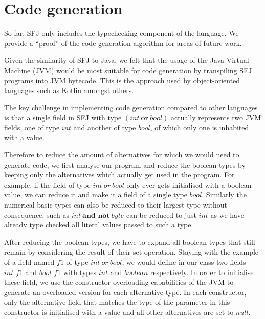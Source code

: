 \documentclass[runningheads]{llncs}
\begin{document}

\section{Code generation}

So far, SFJ only includes the typechecking component of the language. We provide a ``proof'' of the code generation algorithm for areas of future work.

Given the similarity of SFJ to Java, we felt that the usage of the Java Virtual Machine (JVM) \cite{lindholm2013} would be most suitable for code generation by transpiling SFJ programs into JVM bytecode.
This is the approach used by object-oriented languages such as Kotlin amongst others.

The key challenge in implementing code generation compared to other languages is that a single field in SFJ with type $(int\ \textbf{or}\ bool)$ actually represents two JVM fields, one of type $int$ and another of type $bool$, of which only one is inhabited with a value.

Therefore to reduce the amount of alternatives for which we would need to generate code, we first analyse our program and reduce the boolean types by keeping only the alternatives which actually get used in the program.
For example, if the field of type $int\ or\ bool$ only ever gets initialised with a boolean value, we can reduce it and make it a field of a single type $bool$.
Similarly the numerical basic types can also be reduced to their largest type without consequence, such as $int\ \textbf{and not}\ byte$ can be reduced to just $int$ as we have already type checked all literal values passed to such a type.

After reducing the boolean types, we have to expand all boolean types that still remain by considering the result of their set operation.
Staying with the example of a field named $f1$ of type $int\ or\ bool$, we would define in our class two fields $int\_f1$ and $bool\_f1$ with types $int$ and $boolean$ respectively.
In order to initialise these field, we use the constructor overloading capabilities of the JVM to generate an overloaded version for each alternative type.
In each constructor, only the alternative field that matches the type of the parameter in this constructor is initialised with a value and all other alternatives are set to $null$.
\end{document}
